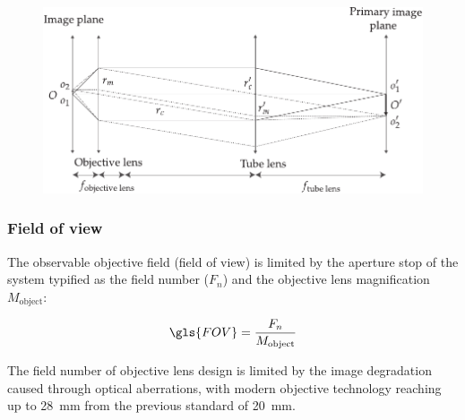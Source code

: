 \begin{figure}
    \centering
    \includegraphics{./magnification}
    \caption{}
    \label{fig:magnification}
\end{figure}






\subsubsection{Field of view}

The observable objective field (field of view) is limited by the aperture stop of the system typified as the field number ($F_n $) and the \gls{objective lens} magnification $M_{\text{object}}$:

\begin{align}
\gls{FOV} = \frac{F_{n}}{M_{\text{object}}}
\end{align}

The field number of \gls{objective lens} design is limited by the image degradation caused through optical aberrations, with modern objective technology reaching up to \SI{28}{\milli\meter} from the previous standard of \SI{20}{\milli\meter}.

